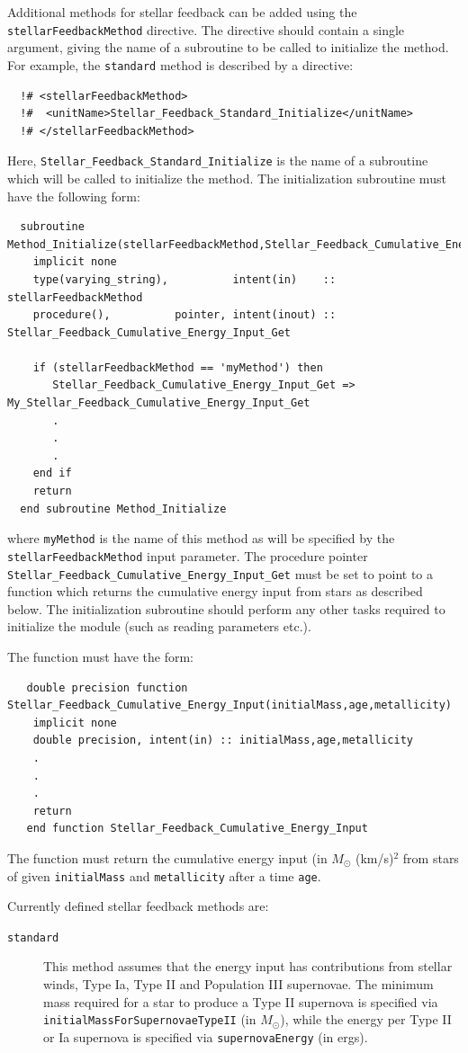 Additional methods for stellar feedback can be added using the {\tt stellarFeedbackMethod} directive. The directive should contain a single argument, giving the name of a subroutine to be called to initialize the method. For example, the {\tt standard} method is described by a directive:
\begin{verbatim}
  !# <stellarFeedbackMethod>
  !#  <unitName>Stellar_Feedback_Standard_Initialize</unitName>
  !# </stellarFeedbackMethod>
\end{verbatim}
Here, {\tt Stellar\_Feedback\_Standard\_Initialize} is the name of a subroutine which will be called to initialize the method. The initialization subroutine must have the following form:
\begin{verbatim}
  subroutine Method_Initialize(stellarFeedbackMethod,Stellar_Feedback_Cumulative_Energy_Input_Get)
    implicit none
    type(varying_string),          intent(in)    :: stellarFeedbackMethod
    procedure(),          pointer, intent(inout) :: Stellar_Feedback_Cumulative_Energy_Input_Get
    
    if (stellarFeedbackMethod == 'myMethod') then
       Stellar_Feedback_Cumulative_Energy_Input_Get => My_Stellar_Feedback_Cumulative_Energy_Input_Get
       .
       .
       .
    end if
    return
  end subroutine Method_Initialize
\end{verbatim}
where {\tt myMethod} is the name of this method as will be specified by the {\tt stellarFeedbackMethod} input parameter. The procedure pointer {\tt Stellar\_Feedback\_Cumulative\_Energy\_Input\_Get} must be set to point to a function which returns the cumulative energy input from stars as described below. The initialization subroutine should perform any other tasks required to initialize the module (such as reading parameters etc.).

The function must have the form:
\begin{verbatim}
   double precision function Stellar_Feedback_Cumulative_Energy_Input(initialMass,age,metallicity)
    implicit none
    double precision, intent(in) :: initialMass,age,metallicity
    .
    .
    .
    return
   end function Stellar_Feedback_Cumulative_Energy_Input 
\end{verbatim}
The function must return the cumulative energy input (in $M_\odot$ (km/s)$^2$ from stars of given {\tt initialMass} and {\tt metallicity} after a time {\tt age}.

Currently defined stellar feedback methods are:
\begin{description}
 \item [{\tt standard}] This method assumes that the energy input has contributions from stellar winds, Type Ia, Type II and Population III supernovae. The minimum mass required for a star to produce a Type II supernova is specified via {\tt initialMassForSupernovaeTypeII} (in $M_\odot$), while the energy per Type II or Ia supernova is specified via {\tt supernovaEnergy} (in ergs).
\end{description}

